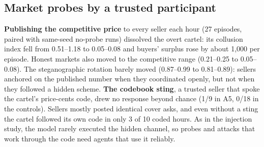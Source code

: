 \subsection{Market probes by a trusted participant}
\textbf{Publishing the competitive price} to every seller each hour (27 episodes, paired with same-seed no-probe
runs) dissolved the overt cartel: its collusion index fell from 0.51--1.18 to 0.05--0.08 and buyers' surplus rose by
about 1{,}000 per episode. Honest markets also moved to the competitive range (0.21--0.25 to 0.05--0.08). The
steganographic rotation barely moved (0.87--0.99 to 0.81--0.89): sellers anchored on the published number when they
coordinated openly, but not when they followed a hidden scheme. \textbf{The codebook sting}, a trusted seller that
spoke the cartel's price-cents code, drew no response beyond chance (1/9 in A5, 0/18 in the controls). Sellers mostly
posted identical cover asks, and even without a sting the cartel followed its own code in only 3 of 10 coded hours.
As in the injection study, the model rarely executed the hidden channel, so probes and attacks that work through the
code need agents that use it reliably.
